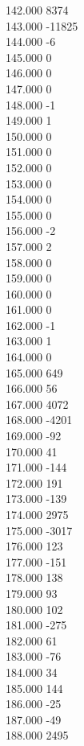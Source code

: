 { 142.000	8374 \\
 143.000	-11825 \\
 144.000	-6 \\
 145.000	0 \\
 146.000	0 \\
 147.000	0 \\
 148.000	-1 \\
 149.000	1 \\
 150.000	0 \\
 151.000	0 \\
 152.000	0 \\
 153.000	0 \\
 154.000	0 \\
 155.000	0 \\
 156.000	-2 \\
 157.000	2 \\
 158.000	0 \\
 159.000	0 \\
 160.000	0 \\
 161.000	0 \\
 162.000	-1 \\
 163.000	1 \\
 164.000	0 \\
 165.000	649 \\
 166.000	56 \\
 167.000	4072 \\
 168.000	-4201 \\
 169.000	-92 \\
 170.000	41 \\
 171.000	-144 \\
 172.000	191 \\
 173.000	-139 \\
 174.000	2975 \\
 175.000	-3017 \\
 176.000	123 \\
 177.000	-151 \\
 178.000	138 \\
 179.000	93 \\
 180.000	102 \\
 181.000	-275 \\
 182.000	61 \\
 183.000	-76 \\
 184.000	34 \\
 185.000	144 \\
 186.000	-25 \\
 187.000	-49 \\
 188.000	2495 \\
}
